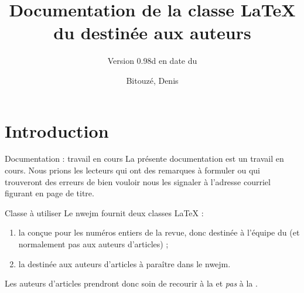 \documentclass[french,nolocaltoc]{nwejmart}
\newcommand{\releaseversion}{0.98d}
\newtheorem[title=Fait,style=definition]{fact}
\begin{document}
\title[Documentation de la classe \LaTeX{} du
\texorpdfstring{\nwejm}{NWEJM}]{Documentation de la classe \LaTeX{} du \nwejm*{}
  destinée aux auteurs}%
%
\subtitle[Version \releaseversion{} (\DTMusedate{release-date})]{\small Version \releaseversion{} en
  date du }%
%
\author[%
affiliation={%
  Université du Littoral Côte d'Opale, Laboratoire de mathématiques pures et
  appliquées (\nolinkurl{denis.bitouze@univ-littoral.fr})%
},%
]{Bitouzé, Denis}
%
\maketitle
%
\etocarticlestylenomarks
\localtableofcontents
%

\section{Introduction}
\label{sec-introduction}

\begin{dbremark}{Documentation : travail en cours}{}
  La présente documentation est un travail en cours. Nous prions les lecteurs
  qui ont des remarques à formuler ou qui trouveront des erreurs de bien vouloir
  nous les signaler à l'adresse courriel figurant en page de titre.
\end{dbremark}

\begin{dbwarning}{Classe à utiliser}{}
  Le \gls{nwejm} fournit deux classes \LaTeX{} :
  \begin{enumerate}
  \item la \nwejmcl{} conçue pour les numéros entiers de la revue, donc destinée
    à l'équipe du \nwejm{} (et normalement pas aux auteurs d'articles) ;
  \item la \nwejmauthorcl{} destinée aux auteurs d'articles à paraître dans le
    \gls{nwejm}.
  \end{enumerate}
  Les auteurs d'articles prendront donc soin de recourir à la \nwejmauthorcl{}
  et \emph{pas} à la \nwejmcl{}.
\end{dbwarning}
\end{document}
